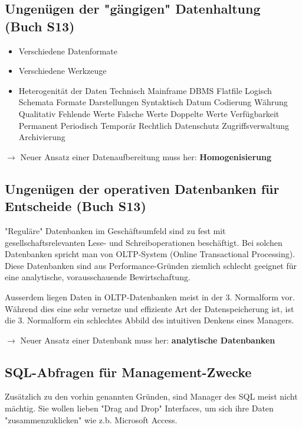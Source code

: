\documentclass[a4paper, 11pt]{article}
\begin{document}
\newpage

\subsection{Ungenügen der "gängigen" Datenhaltung (Buch S13)}

\begin{itemize}
	\item Verschiedene Datenformate
	\item Verschiedene Werkzeuge
	\item Heterogenität der Daten
		\subitem Technisch
			\subsubitem Mainframe
			\subsubitem DBMS
			\subsubitem Flatfile
		\subitem Logisch
			\subsubitem Schemata
			\subsubitem Formate
			\subsubitem Darstellungen
		\subitem Syntaktisch
			\subsubitem Datum
			\subsubitem Codierung
			\subsubitem Währung
		\subitem Qualitativ
			\subsubitem Fehlende Werte
			\subsubitem Falsche Werte
			\subsubitem Doppelte Werte
		\subitem Verfügbarkeit
			\subsubitem Permanent
			\subsubitem Periodisch
			\subsubitem Temporär
		\subitem Rechtlich
			\subsubitem Datenschutz
			\subsubitem Zugriffsverwaltung
			\subsubitem Archivierung
\end{itemize}

$\longrightarrow$ Neuer Ansatz einer Datenaufbereitung muss her: \textbf{Homogenisierung}

\subsection{Ungenügen der operativen Datenbanken für Entscheide (Buch S13)}

"Reguläre" Datenbanken im Geschäftsumfeld sind zu fest mit gesellschaftsrelevanten Lese- und Schreiboperationen beschäftigt. Bei solchen Datenbanken spricht man von OLTP-System (Online Transactional Processing). Diese Datenbanken sind aus Performance-Gründen ziemlich schlecht geeignet für eine analytische, vorausschauende Bewirtschaftung.

Ausserdem liegen Daten in OLTP-Datenbanken meist in der 3. Normalform vor. Während dies eine sehr vernetze und effiziente Art der Datenspeicherung ist, ist die 3. Normalform ein schlechtes Abbild des intuitiven Denkens eines Managers.

$\rightarrow$ Neuer Ansatz einer Datenbank muss her: \textbf{analytische Datenbanken}

\subsection{SQL-Abfragen für Management-Zwecke}
Zusätzlich zu den vorhin genannten Gründen, sind Manager des SQL meist nicht mächtig. Sie wollen lieben "Drag and Drop" Interfaces, um sich ihre Daten "zusammenzuklicken" wie z.b. Microsoft Access.
\end{document}
